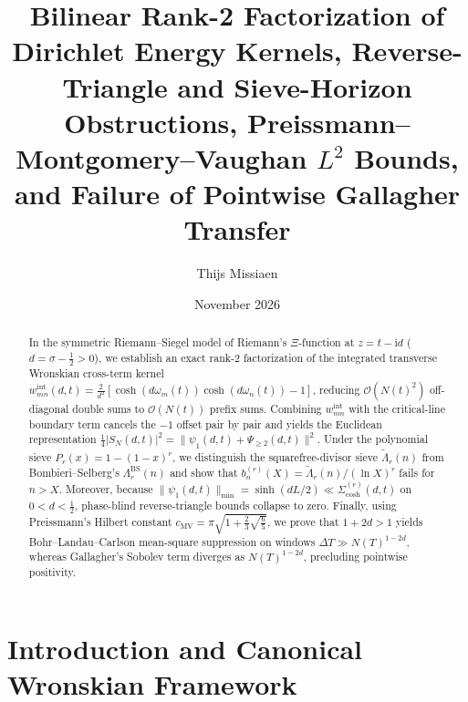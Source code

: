 \documentclass[11pt,reqno]{amsart}
\title[Bilinear Rank-2 Wronskian Kernels and Preissmann--Montgomery--Vaughan Bounds]{Bilinear Rank-2 Factorization of Dirichlet Energy Kernels, Reverse-Triangle and Sieve-Horizon Obstructions, Preissmann--Montgomery--Vaughan $L^2$ Bounds, and Failure of Pointwise Gallagher Transfer}
\author{Thijs Missiaen}
\date{November 2026}
\theoremstyle{definition}
\theoremstyle{remark}
\numberwithin{equation}{section}
\newcommand{\ii}{\mathrm{i}}
\begin{document}
\begin{abstract}
In the symmetric Riemann--Siegel model of Riemann's $\Xi$-function at $z = t - \ii d$ ($d = \sigma - \frac{1}{2} > 0$), we establish an exact rank-2 factorization of the integrated transverse Wronskian cross-term kernel $w_{mn}^{\mathrm{int}}(d,t) = \frac{2}{d^2}[\cosh(d\omega_m(t))\cosh(d\omega_n(t)) - 1]$, reducing $\mathcal{O}(N(t)^2)$ off-diagonal double sums to $\mathcal{O}(N(t))$ prefix sums. Combining $w_{mn}^{\mathrm{int}}$ with the critical-line boundary term cancels the $-1$ offset pair by pair and yields the Euclidean representation $\frac{1}{4}\lvert S_N(d,t)\rvert^2 = \lVert\psi_1(d,t) + \Psi_{\ge 2}(d,t)\rVert^2$. Under the polynomial sieve $P_r(x) = 1 - (1-x)^r$, we distinguish the squarefree-divisor sieve $\widetilde{\Lambda}_r(n)$ from Bombieri--Selberg's $\Lambda_r^{\mathrm{BS}}(n)$ and show that $b_n^{(r)}(X) = \widetilde{\Lambda}_r(n)/(\ln X)^r$ fails for $n > X$. Moreover, because $\lVert\psi_1(d,t)\rVert_{\min} = \sinh(dL/2) \ll \Sigma_{\cosh}^{(r)}(d,t)$ on $0 < d < \frac{1}{2}$, phase-blind reverse-triangle bounds collapse to zero. Finally, using Preissmann's Hilbert constant $c_{\mathrm{MV}} = \pi\sqrt{1 + \frac{2}{3}\sqrt{\frac{6}{5}}}$, we prove that $1 + 2d > 1$ yields Bohr--Landau--Carlson mean-square suppression on windows $\Delta T \gg N(T)^{1-2d}$, whereas Gallagher's Sobolev term diverges as $N(T)^{1-2d}$, precluding pointwise positivity.
\end{abstract}

\maketitle

\section{Introduction and Canonical Wronskian Framework}\label{sec:intro}
\end{document}
